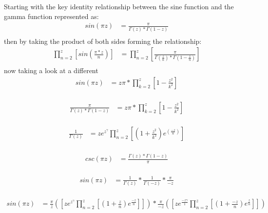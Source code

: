 \documentclass{article}
\begin{document}
Starting with the key identity relationship between the sine function and the gamma function represented as:
\begin{align*}
sin(\pi z) &= \frac{\pi}{\Gamma\left(z\right) * \Gamma\left(1 - z\right)} \\
\end{align*}
then by taking the product of both sides forming the relationship:
\begin{align*}
\prod_{n=2}^z\left[sin(\frac{\pi * z}{n})\right] &= \prod_{n=2}^z\left[\frac{\pi}{\Gamma\left(\frac{z}{n}\right) * \Gamma\left(1 - \frac{z}{n}\right)}\right] \\
\end{align*}
now taking a look at a different
\begin{align*}
sin(\pi z) &= z\pi * \prod_{k=2}^z\left[1 - \frac{z^2}{k^2}\right] \\
\end{align*}

\begin{align*}
\frac{\pi}{\Gamma\left(z\right) * \Gamma\left(1 - z\right)} &= z\pi * \prod_{k=2}^z\left[1 - \frac{z^2}{k^2}\right] \\
\end{align*}

\begin{align*}
\frac{1}{\Gamma\left(z\right)} &= ze^z^\gamma \prod_{n=2}^z\left[\left(1 + \frac{z^2}{k^2}\right)e^\left(\frac{-z}{n}\right)\right] \\
\end{align*}

\begin{align*}
csc(\pi z) &= \frac{\Gamma\left(z\right) * \Gamma\left(1 - z\right)}{\pi} \\
\end{align*}

\begin{align*}
sin(\pi z) &= \frac{1}{\Gamma\left(z\right)} * \frac{1}{\Gamma\left(- z\right)} * \frac{\pi}{-z} \\
\end{align*}

\begin{align*}
sin(\pi z) &= \frac{\pi}{z} \left(\left[ze^z^\gamma \prod_{n=2}^z \left[\left(1 + \frac{z}{n}\right)e^\frac{-z}{n}\right]\right]\right) * \frac{\pi}{-z} \left(\left[ze^\frac{-z\gamma}{1} \prod_{n=2}^z \left[\left(1 + \frac{-z}{n}\right)e^\frac{z}{n}\right]\right]\right)
\end{align*}
\end{document}
